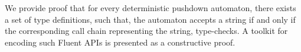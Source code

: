 We provide proof that for every deterministic pushdown automaton,
  there exists a set of \Java type definitions, such that,
  the automaton accepts a string if and only if the corresponding 
  call chain representing the string, type-checks.
A toolkit for encoding such Fluent APIs is presented as a constructive proof.
